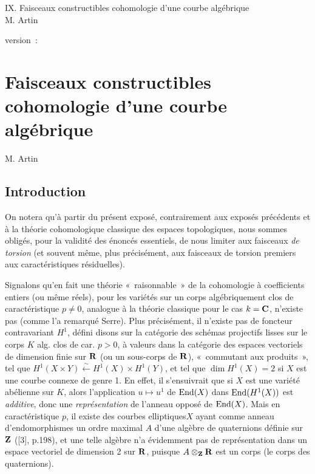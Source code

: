 \documentclass[10pt]{../fichiers-configuration-latex/smfart}
\begin{document}
\begin{center}
IX. Faisceaux constructibles cohomologie d'une courbe algébrique\\
M. Artin 
\end{center}

version : \showgitstatus{}
\tableofcontents

\else
\chapter{Faisceaux constructibles cohomologie d'une courbe algébrique}
\begin{center}
M. Artin 
\end{center}
\fi

\setcounter{pageoriginal}{0}

\setcounter{section}{-1}
\section{Introduction}\pageoriginale

On notera qu'à partir du présent exposé, contrairement aux exposés
précédents et à la théorie cohomologique classique des espaces
topologiques, nous sommes obligés, pour la validité des énoncés
essentiels, de nous limiter aux faisceaux \emph{de torsion} (et
souvent même, plus précisément, aux faisceaux de torsion premiers aux
caractéristiques résiduelles).

Signalons qu'en fait une théorie « raisonnable »  de la
cohomologie à coefficients entiers (ou même réels), pour les variétés
sur un corps algébriquement clos de caractéristique $p\neq 0$,
analogue à la théorie classique pour le cas
$k=\mathbf{C}$, n'existe
pas (comme l'a remarqué Serre). Plus précisément, il n'existe pas de
foncteur contravariant $H^1$, défini disons sur la catégorie des
schémas projectifs lisses sur le corps $K$ alg. clos de car. $p> 0$, à
valeurs dans la catégorie des espaces vectoriels de dimension finie
sur $\mathbf{R}$  (ou un sous-corps de $\mathbf{R}$),
« commutant aux produits », \ie tel que $H^1(X\times
Y)\xleftarrow{\sim}H^1(X)\times H^1(Y)$, et tel que $\dim H^1(X)=2$ si
$X$ est une courbe connexe de genre 1. En effet, il s'ensuivrait que
si $X$ est une variété abélienne sur $K$, alors l'application
$u\mapsto u^1$ de $\operatorname{End}(X)$ dans $\operatorname{End}(H^1(X))$ est \emph{additive},
donc une \emph{représentation} de l'anneau opposé de $\operatorname{End}(X)$. Mais
en caractéristique $p$, il existe des courbes
elliptiques\pageoriginale $X$ ayant comme anneau d'endomorphismes un
ordre maximal $A$ d'une algèbre de quaternions définie sur
$\mathbf{Z}$ ([3], p.198), et une telle algèbre n'a
évidemment pas de représentation dans un espace vectoriel de dimension
2 sur $\mathbf{R}$, puisque
$A\otimes_{\mathbf{Z}}\mathbf{R}$ est un corps
(le corps des quaternions).
\end{document}
